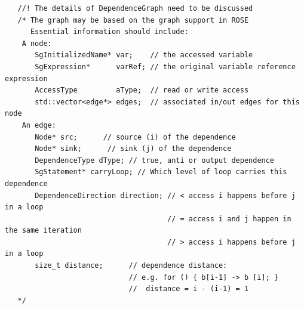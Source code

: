 \begin{enumerate}
\begin{enumerate}
\begin{lstlisting}
   //! The details of DependenceGraph need to be discussed
   /* The graph may be based on the graph support in ROSE
      Essential information should include:
    A node: 
       SgInitializedName* var;    // the accessed variable
       SgExpression*      varRef; // the original variable reference expression 
       AccessType         aType;  // read or write access
       std::vector<edge*> edges;  // associated in/out edges for this node
    An edge:
       Node* src;      // source (i) of the dependence
       Node* sink;      // sink (j) of the dependence
       DependenceType dType; // true, anti or output dependence
       SgStatement* carryLoop; // Which level of loop carries this dependence
       DependenceDirection direction; // < access i happens before j in a loop
                                      // = access i and j happen in the same iteration
                                      // > access i happens before j in a loop
       size_t distance;      // dependence distance: 
                             // e.g. for () { b[i-1] -> b [i]; } 
                             //  distance = i - (i-1) = 1
   */ 
   \end{lstlisting}

   \end{enumerate}

\end{enumerate}

